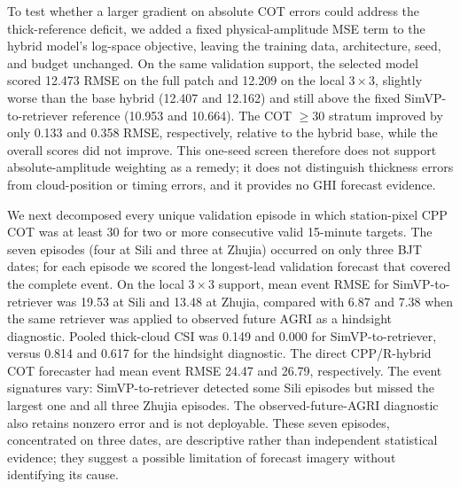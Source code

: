 \documentclass[11pt]{article}
\begin{document}
To test whether a larger gradient on absolute COT errors could address the thick-reference deficit, we added a fixed physical-amplitude MSE term to the hybrid model's log-space objective, leaving the training data, architecture, seed, and budget unchanged. On the same validation support, the selected model scored 12.473 RMSE on the full patch and 12.209 on the local $3\times3$, slightly worse than the base hybrid (12.407 and 12.162) and still above the fixed SimVP-to-retriever reference (10.953 and 10.664). The COT $\geq30$ stratum improved by only 0.133 and 0.358 RMSE, respectively, relative to the hybrid base, while the overall scores did not improve. This one-seed screen therefore does not support absolute-amplitude weighting as a remedy; it does not distinguish thickness errors from cloud-position or timing errors, and it provides no GHI forecast evidence.

We next decomposed every unique validation episode in which station-pixel CPP COT was at least 30 for two or more consecutive valid 15-minute targets. The seven episodes (four at Sili and three at Zhujia) occurred on only three BJT dates; for each episode we scored the longest-lead validation forecast that covered the complete event. On the local $3\times3$ support, mean event RMSE for SimVP-to-retriever was 19.53 at Sili and 13.48 at Zhujia, compared with 6.87 and 7.38 when the same retriever was applied to observed future AGRI as a hindsight diagnostic. Pooled thick-cloud CSI was 0.149 and 0.000 for SimVP-to-retriever, versus 0.814 and 0.617 for the hindsight diagnostic. The direct CPP/R-hybrid COT forecaster had mean event RMSE 24.47 and 26.79, respectively. The event signatures vary: SimVP-to-retriever detected some Sili episodes but missed the largest one and all three Zhujia episodes. The observed-future-AGRI diagnostic also retains nonzero error and is not deployable. These seven episodes, concentrated on three dates, are descriptive rather than independent statistical evidence; they suggest a possible limitation of forecast imagery without identifying its cause.
\end{document}
